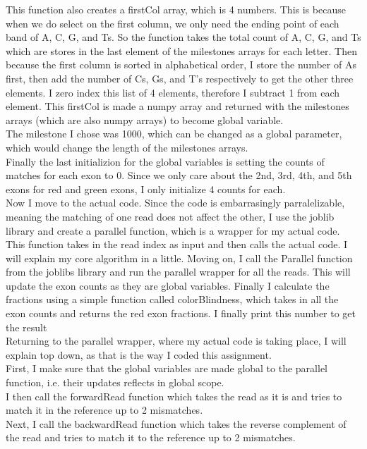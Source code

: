 \documentclass[12pt]{article}
\begin{document}
This function also creates a firstCol array, which is 4 numbers. This is because when we do select on the first column, we only need the ending point of each band of A, C, G, and Ts. So the function takes the total count of A, C, G, and Ts which are stores in the last element of the milestones arrays for each letter. Then because the first column is sorted in alphabetical order, I store the number of As first, then add the number of Cs, Gs, and T's respectively to get the other three elements. I zero index this list of 4 elements, therefore I subtract 1 from each element. This firstCol is made a numpy array and returned with the milestones arrays (which are also numpy arrays) to become global variable.\\
The milestone I chose was 1000, which can be changed as a global parameter, which would change the length of the milestones arrays.\\
Finally the last initializion for the global variables is setting the counts of matches for each exon to 0. Since we only care about the 2nd, 3rd, 4th, and 5th exons for red and green exons, I only initialize 4 counts for each.\\
Now I move to the actual code. Since the code is embarrasingly parralelizable, meaning the matching of one read does not affect the other, I use the joblib library and create a parallel function, which is a wrapper for my actual code. This function takes in the read index as input and then calls the actual code. I will explain my core algorithm in a little. Moving on, I call the Parallel function from the joblibs library and run the parallel wrapper for all the reads. This will update the exon counts as they are global variables. Finally I calculate the fractions using a simple function called colorBlindness, which takes in all the exon counts and returns the red exon fractions. I finally print this number to get the result\\
Returning to the parallel wrapper, where my actual code is taking place, I will explain top down, as that is the way I coded this assignment.\\
First, I make sure that the global variables are made global to the parallel function, i.e. their updates reflects in global scope.\\
I then call the forwardRead function which takes the read as it is and tries to match it in the reference up to 2 mismatches.\\
Next, I call the backwardRead function which takes the reverse complement of the read and tries to match it to the reference up to 2 mismatches.\\
\end{document}
